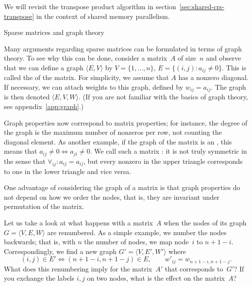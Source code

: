 We will revisit the transpose product algorithm in
section~\ref{sec:shared-crs-transpose} in the context of shared memory
parallelism.



 {Sparse matrices and graph theory}
\label{sec:sparse-graph}

Many arguments regarding sparse matrices can be formulated in terms of
graph theory.  To see why this can be done,
consider a matrix~$A$ of size~$n$ and observe that we can
define a graph $\langle E,V\rangle$ by $V=\{1,\ldots,n\}$, $E=\{(i,j)\colon
a_{ij}\not=0\}$. This is called the  of the
matrix. For simplicity, we assume that $A$ has a nonzero
diagonal. 
If
necessary, we can attach weights to this graph, defined by
$w_{ij}=a_{ij}$. The graph is then denoted $\langle E,V,W\rangle$.
(If you are not familiar with the basics of graph
theory, see appendix~\ref{app:graph}.)

Graph properties now correspond to matrix properties; for instance,
the degree of the graph is the maximum number of nonzeros per row, not
counting the diagonal element. As another example, if the graph of the
matrix is an , this means that
$a_{ij}\not=0\Leftrightarrow a_{ji}\not=0$. We call such a matrix
: it is not truly symmetric in the
sense that $\forall_{ij}\colon a_{ij}=a_{ij}$, but every nonzero in
the upper triangle corresponds to one in the lower triangle and vice versa.

One advantage of considering the graph of a matrix is that graph properties
do not depend on how we order the nodes, that is, they are invariant
under permutation of the matrix.

\begin{exercise}
  Let us take a look at what happens with a matrix~$A$ when the nodes
  of its graph $G=\langle V,E,W\rangle$ are renumbered. As a simple example,
  we number the nodes backwards; that is, with $n$ the number of
  nodes, we map node~$i$ to $n+1-i$.
  Correspondingly, we find a new graph
  $G'=\langle V,E',W'\rangle$ where
  \[ (i,j)\in E'\Leftrightarrow (n+1-i,n+1-j)\in E,\qquad
  w'_{ij}=w_{n+1-i,n+1-j}.\]
  What does this renumbering imply for the matrix~$A'$ that
  corresponds to~$G'$? If you exchange the labels $i,j$ on two nodes,
  what is the effect on the matrix~$A$?
\end{exercise}

